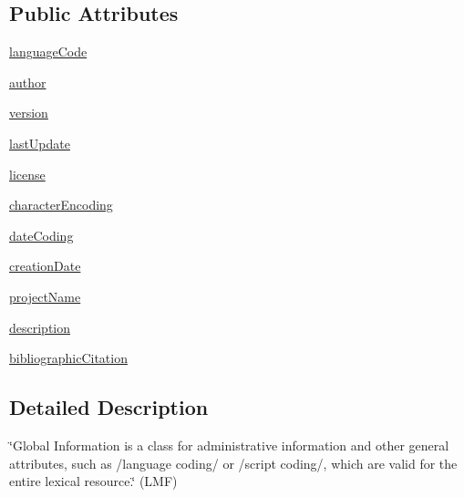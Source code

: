 \subsection*{Public Attributes}
\begin{DoxyCompactItemize}
\item 
\hyperlink{classlmf_1_1src_1_1core_1_1global__information_1_1_global_information_a13b6750b6876cade278c3cde1f0625a2}{language\+Code}
\item 
\hyperlink{classlmf_1_1src_1_1core_1_1global__information_1_1_global_information_a96ffe5559235b6b6c681b45a61d697af}{author}
\item 
\hyperlink{classlmf_1_1src_1_1core_1_1global__information_1_1_global_information_a6a0bbf60025ea9503bb541a0ffbd514a}{version}
\item 
\hyperlink{classlmf_1_1src_1_1core_1_1global__information_1_1_global_information_a11e84dd6e15ae319bc1427388614eb31}{last\+Update}
\item 
\hyperlink{classlmf_1_1src_1_1core_1_1global__information_1_1_global_information_a1f086ce6c56515e2c6fd853c7007d015}{license}
\item 
\hyperlink{classlmf_1_1src_1_1core_1_1global__information_1_1_global_information_a7fd2e0b92537d9a5d055ef6726617d1e}{character\+Encoding}
\item 
\hyperlink{classlmf_1_1src_1_1core_1_1global__information_1_1_global_information_a53110d17cbf0bfdcb72fb089e648aa70}{date\+Coding}
\item 
\hyperlink{classlmf_1_1src_1_1core_1_1global__information_1_1_global_information_a45c08bbe888ab19297d903a952085c0c}{creation\+Date}
\item 
\hyperlink{classlmf_1_1src_1_1core_1_1global__information_1_1_global_information_ac22ab44249ba844254fcdc84e7f330fc}{project\+Name}
\item 
\hyperlink{classlmf_1_1src_1_1core_1_1global__information_1_1_global_information_aa37acb480d22d4b7c79ece3f04a6e1a2}{description}
\item 
\hyperlink{classlmf_1_1src_1_1core_1_1global__information_1_1_global_information_a02d9de85d8225dc1411986b763df19ab}{bibliographic\+Citation}
\end{DoxyCompactItemize}


\subsection{Detailed Description}
\char`\"{}\+Global Information is a class for administrative information and other general attributes, such as /language coding/ or /script coding/, which are valid for the entire lexical resource.\char`\"{} (L\+M\+F) 

